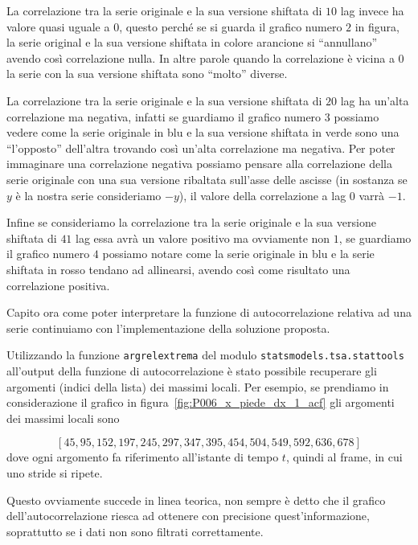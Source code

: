 La correlazione tra la serie originale e la sua versione shiftata di $10$ lag invece ha valore
quasi uguale a $0$, questo perché se si guarda il grafico numero $2$ in figura, la serie 
original e la sua versione shiftata in colore arancione si ``annullano'' avendo così correlazione
nulla. In altre parole quando la correlazione è vicina a $0$ la serie con la sua versione shiftata
sono ``molto'' diverse.

La correlazione tra la serie originale e la sua versione shiftata di $20$ lag ha un'alta correlazione
ma negativa, infatti se guardiamo il grafico numero $3$ possiamo vedere come la serie originale in blu
e la sua versione shiftata in verde sono una ``l'opposto'' dell'altra trovando così un'alta correlazione
ma negativa. Per poter immaginare una correlazione negativa possiamo pensare alla correlazione della serie
originale con una sua versione ribaltata sull'asse delle ascisse (in sostanza se $y$ è la nostra serie consideriamo $-y$),
il valore della correlazione a lag $0$ varrà $-1$.

Infine se consideriamo la correlazione tra la serie originale e la sua versione shiftata di $41$ lag
essa avrà un valore positivo ma ovviamente non $1$, se guardiamo il grafico numero $4$ possiamo notare
come la serie originale in blu e la serie shiftata in rosso tendano ad allinearsi, avendo così
come risultato una correlazione positiva.

Capito ora come poter interpretare la funzione di autocorrelazione relativa ad una serie 
continuiamo con l'implementazione della soluzione proposta.

\begin{sloppypar}
Utilizzando la funzione \texttt{argrelextrema} del modulo \texttt{statsmodels.tsa.stattools}
all'output della funzione di autocorrelazione è stato possibile recuperare gli argomenti (indici della lista) dei massimi locali.
Per esempio, se prendiamo in considerazione il grafico in figura~\ref{fig:P006_x_piede_dx_1_acf} gli argomenti
dei massimi locali sono
\end{sloppypar}
\[ [45, 95, 152, 197, 245, 297, 347, 395, 454, 504, 549, 592, 636, 678] \]
dove ogni argomento fa riferimento all'istante di tempo $t$, quindi al frame, in cui uno stride si ripete.

\begin{sloppypar}
Questo ovviamente succede in linea teorica, non sempre è detto che il grafico dell'autocorrelazione
riesca ad ottenere con precisione quest'informazione, soprattutto se i dati non sono filtrati correttamente.
\end{sloppypar}

